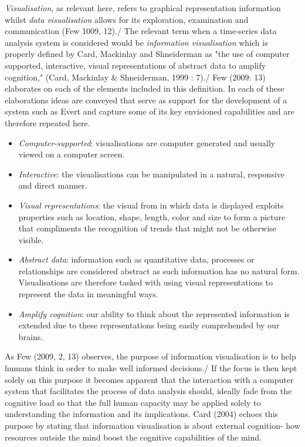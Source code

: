 \documentclass[a4paper,12pt]{article}
\begin{document}
\emph{Visualisation}, as relevant here, refers to graphical representation information whilst
 \emph{data visualisation} allows for its exploration, examination and communication (Few 1009, 12)./
The relevant term when a time-series data analysis system is considered would be \emph{information visualisation}
which is properly defined by Card, Mackinlay and Shneiderman as "the use of computer supported,
interactive, visual representations of abstract data to amplify cognition," (Card, Mackinlay & Shneiderman, 1999 : 7)./
Few (2009: 13) elaborates on each of the elements included in this definition.
In each of these elaborations ideas are conveyed that serve as support for the development of a system such as Evert and 
capture some of its key envisioned capabilities and are therefore repeated here.
\begin{itemize}[label=-]
 \item{\emph{Computer-supported}: visualisations are computer generated and usually viewed on a computer screen.}
\item{\emph{Interactive}: the visualisations can be manipulated in a natural, responsive and direct manner.}
\item{\emph{Visual representations}: the visual from in which data is displayed exploits properties such as location,
shape, length, color and size to form a picture that compliments the recognition of trends that might not be otherwise
visible.}
\item{\emph{Abstract data}: information such as quantitative data, processes or relationships are considered abstract as
such information has no natural form. Visualisations are therefore tasked with using visual representations to represent the data in meaningful ways.}
\item{\emph{Amplify cognition}: our ability to think about the represented information is extended
due to these representations being easily comprehended by our brains.}
\end{itemize}
	
 As Few (2009, 2, 13) observes, the purpose of information visualisation is to help humans think in order to make well informed decisions./
 If the focus is then kept solely on this purpose it becomes apparent that the interaction with a computer system
 that facilitates the process of data analysis should,
 ideally fade from the cognitive load so that the full human capacity may be applied solely to understanding the information
 and its implications.
 Card (2004) echoes this purpose by stating that information visualisation is about external cognition- how resources outside the mind
 boost the cognitive capabilities of the mind.
 
\end{document}
